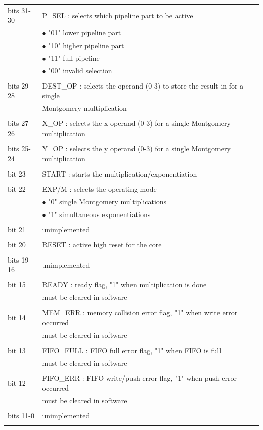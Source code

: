 \begin{tabular}{ll}
bits 31-30 	& P\_SEL : selects which pipeline part to be active\\
 			& $\bullet$  "01" lower pipeline part\\
 			& $\bullet$  "10" higher pipeline part\\
 			& $\bullet$  "11" full pipeline\\
 			& $\bullet$  "00" invalid selection\\
 			&\\
bits 29-28 	& DEST\_OP : selects the operand (0-3) to store the result in for a single\\
 			& Montgomery multiplication\footnotemark\\
 			&\\
bits 27-26 	& X\_OP : selects the x operand (0-3) for a single Montgomery multiplication\footnotemark[\value{footnote}]\\
			&\\
bits 25-24 	& Y\_OP : selects the y operand (0-3) for a single Montgomery multiplication\footnotemark[\value{footnote}]\\
			&\\
bit 23 		& START : starts the multiplication/exponentiation\\
			&\\
bit 22 		& EXP/M : selects the operating mode\\
 			& $\bullet$  "0" single Montgomery multiplications\\
 			& $\bullet$  "1" simultaneous exponentiations\\
 			&\\
bit 21		& unimplemented\\
			&\\
bit 20 		& RESET : active high reset for the core\footnotemark[2]\\
			&\\		
bits 19-16	& unimplemented\\
			&\\
bit 15		& READY : ready flag, "1" when multiplication is done\\
			& must be cleared in software\\
			&\\
bit 14		& MEM\_ERR : memory collision error flag, "1" when write error occurred\\
			& must be cleared in software\\
			&\\
bit 13		& FIFO\_FULL : FIFO full error flag, "1" when FIFO is full\\
			& must be cleared in software\\
			&\\
bit 12		& FIFO\_ERR : FIFO write/push error flag, "1" when push error occurred\\
			& must be cleared in software\\
			&\\
bits 11-0	& unimplemented\\
			&\\
\end{tabular}
